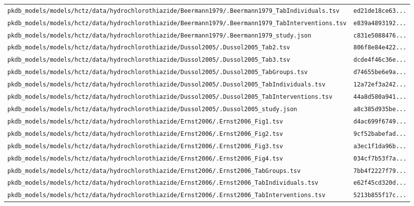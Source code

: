 \begin{longtable}{ll}
\texttt{pkdb\_models/models/hctz/data/hydrochlorothiazide/Beermann1979/.Beermann1979\_TabIndividuals.tsv} & \texttt{ed21de18ce63...} \\
\texttt{pkdb\_models/models/hctz/data/hydrochlorothiazide/Beermann1979/.Beermann1979\_TabInterventions.tsv} & \texttt{e839a4893192...} \\
\texttt{pkdb\_models/models/hctz/data/hydrochlorothiazide/Beermann1979/.Beermann1979\_study.json} & \texttt{c831e5088476...} \\
\texttt{pkdb\_models/models/hctz/data/hydrochlorothiazide/Dussol2005/.Dussol2005\_Tab2.tsv} & \texttt{806f8e84e422...} \\
\texttt{pkdb\_models/models/hctz/data/hydrochlorothiazide/Dussol2005/.Dussol2005\_Tab3.tsv} & \texttt{dcde4f46c36e...} \\
\texttt{pkdb\_models/models/hctz/data/hydrochlorothiazide/Dussol2005/.Dussol2005\_TabGroups.tsv} & \texttt{d74655be6e9a...} \\
\texttt{pkdb\_models/models/hctz/data/hydrochlorothiazide/Dussol2005/.Dussol2005\_TabIndividuals.tsv} & \texttt{12a72ef3a242...} \\
\texttt{pkdb\_models/models/hctz/data/hydrochlorothiazide/Dussol2005/.Dussol2005\_TabInterventions.tsv} & \texttt{44a8d580a941...} \\
\texttt{pkdb\_models/models/hctz/data/hydrochlorothiazide/Dussol2005/.Dussol2005\_study.json} & \texttt{a8c385d935be...} \\
\texttt{pkdb\_models/models/hctz/data/hydrochlorothiazide/Ernst2006/.Ernst2006\_Fig1.tsv} & \texttt{d4ac699f6749...} \\
\texttt{pkdb\_models/models/hctz/data/hydrochlorothiazide/Ernst2006/.Ernst2006\_Fig2.tsv} & \texttt{9cf52babefad...} \\
\texttt{pkdb\_models/models/hctz/data/hydrochlorothiazide/Ernst2006/.Ernst2006\_Fig3.tsv} & \texttt{a3ec1f1da96b...} \\
\texttt{pkdb\_models/models/hctz/data/hydrochlorothiazide/Ernst2006/.Ernst2006\_Fig4.tsv} & \texttt{034cf7b53f7a...} \\
\texttt{pkdb\_models/models/hctz/data/hydrochlorothiazide/Ernst2006/.Ernst2006\_TabGroups.tsv} & \texttt{7bb4f2227f79...} \\
\texttt{pkdb\_models/models/hctz/data/hydrochlorothiazide/Ernst2006/.Ernst2006\_TabIndividuals.tsv} & \texttt{e62f45cd320d...} \\
\texttt{pkdb\_models/models/hctz/data/hydrochlorothiazide/Ernst2006/.Ernst2006\_TabInterventions.tsv} & \texttt{5213b855f17c...} \\

\end{longtable}
